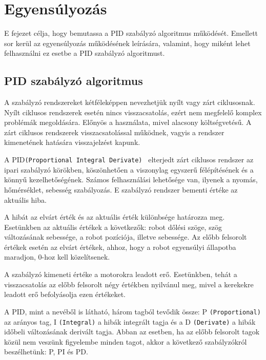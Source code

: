 \chapter{Egyensúlyozás}\label{ch:EGYENSULY}
\begin{osszefoglal}
E fejezet célja, hogy bemutassa a PID szabályzó algoritmus működését. Emellett sor kerül az egyensúlyozás működésének leírására, valamint, hogy miként lehet felhasználni ez esetbe a PID szabályzó algoritmust.
\end{osszefoglal}

\section{PID szabályzó algoritmus}\label{sec:EGYENSULY:pid}

A szabályzó rendszereket kétféleképpen nevezhetjük nyílt vagy zárt ciklusosnak.  Nyílt ciklusos rendszerek esetén nincs visszacsatolás, ezért nem megfelelő komplex problémák megoldására. Előnyös a használata, mivel alacsony költségvetésű. A zárt ciklusos rendszerek visszacsatolással működnek, vagyis a rendszer kimenetének hatására visszajelzést kapunk.

A PID\texttt{(Proportional Integral Derivate)}~\cite{pid} elterjedt zárt ciklusos rendszer az ipari szabályzó körökben, köszönhetően a viszonylag egyszerű félépítésének és a könnyű kezelhetőségének. Számos felhasználási lehetősége van, ilyenek a nyomás, hőmérséklet, sebesség szabályozás. E szabályzó rendszer bementi értéke az aktuális hiba.

A hibát az elvárt érték és az aktuális érték különbsége határozza meg. Esetünkben az aktuális értékek a következők: robot dőlési szöge, szög változásának sebessége, a robot pozíciója, illetve sebessége. Az előbb felsorolt értékek esetén az elvárt értékek, ahhoz, hogy a robot egyensúlyi állapotba maradjon, 0-hoz kell közelítsenek.

A szabályzó kimeneti értéke a motorokra leadott erő. Esetünkben, tehát a visszacsatolás az előbb felsorolt négy értékben nyilvánul meg, mivel a kerekekre leadott erő befolyásolja ezen értékeket.

A PID, mint a nevéből is látható, három tagból tevődik össze: P \texttt{(Proportional)} az arányos tag, I \texttt{(Integral)} a hibák integrált tagja és a D \texttt{(Derivate)} a hibák időbeli változásának derivált tagja. Abban az esetben, ha az előbb felsorolt tagok közül nem veszünk figyelembe minden tagot, akkor a következő szabályzókról beszélhetünk: P, PI és PD.

